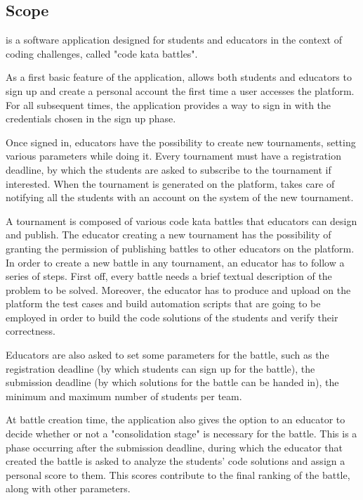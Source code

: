 \subsection{Scope}
	\app is a software application designed for students and educators in the context of coding challenges, called "code kata battles".
	
	As a first basic feature of the application, \app allows both students and educators to sign up and create a personal account the first time a user accesses the platform. For all subsequent times, the application provides a way to sign in with the credentials chosen in the sign up phase.
	
	Once signed in, educators have the possibility to create new tournaments, setting various parameters while doing it. Every tournament must have a registration deadline, by which the students are asked to subscribe to the tournament if interested. When the tournament is generated on the platform, \app takes care of notifying all the students with an account on the system of the new tournament.
	
	A tournament is composed of various code kata battles that educators can design and publish. The educator creating a new tournament has the possibility of granting the permission of publishing battles to other educators on the platform.
	In order to create a new battle in any tournament, an educator has to follow a series of steps. First off, every battle needs a brief textual description of the problem to be solved. Moreover, the educator has to produce and upload on the platform the test cases and build automation scripts that are going to be employed in order to build the code solutions of the students and verify their correctness.

	Educators are also asked to set some parameters for the battle, such as the registration deadline (by which students can sign up for the battle), the submission deadline (by which solutions for the battle can be handed in), the minimum and maximum number of students per team.
	
	At battle creation time, the application also gives the option to an educator to decide whether or not a "consolidation stage" is necessary for the battle. This is a phase occurring after the submission deadline, during which the educator that created the battle is asked to analyze the students' code solutions and assign a personal score to them. This scores contribute to the final ranking of the battle, along with other parameters. 
	
